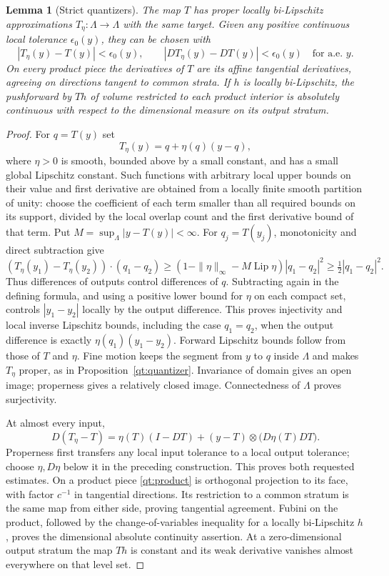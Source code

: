 \documentclass[11pt]{article}
\numberwithin{equation}{section}
\newtheorem{lemma}[theorem]{Lemma}
\theoremstyle{definition}
\theoremstyle{remark}
\begin{document}
\begin{lemma}[Strict quantizers]\label{qt:strict}
The map $T$ has proper locally bi-Lipschitz approximations
$T_\eta:\Lambda\to\Lambda$ with the same target.  Given any positive
continuous local tolerance $\epsilon_0(y)$, they can be chosen with
\[
 |T_\eta(y)-T(y)|<\epsilon_0(y),\qquad
 |DT_\eta(y)-DT(y)|<\epsilon_0(y)\quad\text{for a.e. }y.
\]
On every product piece the derivatives of $T$ are its affine
tangential derivatives, agreeing on directions tangent to common
strata.  If $h$ is locally bi-Lipschitz, the pushforward by $Th$ of
volume restricted to each product interior is absolutely continuous
with respect to the dimensional measure on its output stratum.
\end{lemma}

\begin{proof}
For $q=T(y)$ set
\[
 T_\eta(y)=q+\eta(q)(y-q),
\]
where $\eta>0$ is smooth, bounded above by a small constant, and has a
small global Lipschitz constant.  Such functions with arbitrary local
upper bounds on their value and first derivative are obtained from a
locally finite smooth partition of unity: choose the coefficient of
each term smaller than all required bounds on its support, divided by
the local overlap count and the first derivative bound of that term.
Put $M=\sup_{\Lambda}|y-T(y)|<\infty$.  For $q_j=T(y_j)$,
monotonicity and direct subtraction give
\[
 (T_\eta(y_1)-T_\eta(y_2))\cdot(q_1-q_2)
 \geq(1-\|\eta\|_\infty-M\operatorname{Lip}\eta)|q_1-q_2|^2
 \geq\tfrac12|q_1-q_2|^2.
\]
Thus differences of outputs control differences of $q$.  Subtracting
again in the defining formula, and using a positive lower bound for
$\eta$ on each compact set, controls $|y_1-y_2|$ locally by the output
difference.  This proves injectivity and local inverse Lipschitz
bounds, including the case $q_1=q_2$, when the output difference is
exactly $\eta(q_1)(y_1-y_2)$.  Forward Lipschitz bounds follow from those
of $T$ and $\eta$.  Fine motion keeps the segment from $y$ to $q$
inside $\Lambda$ and makes $T_\eta$ proper, as in
Proposition~\ref{qt:quantizer}.  Invariance of domain gives an open
image; properness gives a relatively closed image.  Connectedness of
$\Lambda$ proves surjectivity.

At almost every input,
\[
 D(T_\eta-T)=\eta(T)(I-DT)
 +(y-T)\otimes\bigl(D\eta(T)DT\bigr).
\]
Properness first transfers any local input tolerance to a local output
tolerance; choose $\eta,D\eta$ below it in the preceding construction.
This proves both requested estimates.  On a product piece
\eqref{qt:product} is orthogonal projection to its face, with factor
$c^{-1}$ in tangential directions.  Its restriction to a common stratum
is the same map from either side, proving tangential agreement.
Fubini on the product, followed by the change-of-variables inequality
for a locally bi-Lipschitz $h$, proves the dimensional absolute
continuity assertion.  At a zero-dimensional output stratum the map
$Th$ is constant and its weak derivative vanishes almost everywhere
on that level set.
\end{proof}
\end{document}
